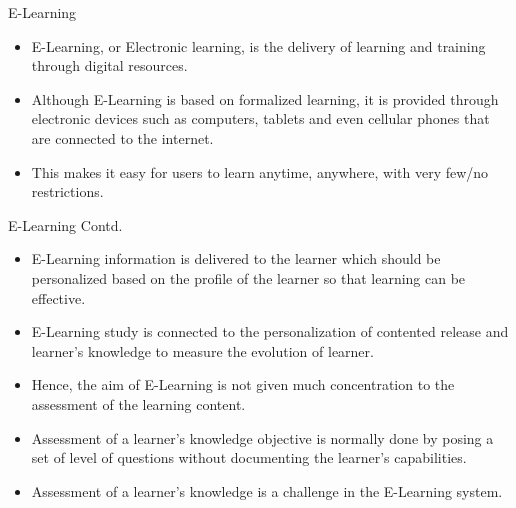 \documentclass{beamer}
\begin{document}
    \begin{frame}
    \begin{block}{E-Learning}
    \begin{itemize}
        \item E-Learning, or Electronic learning, is the delivery of learning and training through digital resources.
        \item Although E-Learning is based on formalized learning, it is provided through electronic devices such as computers, tablets and even cellular phones that are connected to the internet.
        \item This makes it easy for users to learn anytime, anywhere, with very few/no restrictions.
        \end{itemize}
    \end{block}
    \end{frame}
    
    
    
    \begin{frame}
        \begin{block}{E-Learning Contd.}
            \begin{itemize}
            \item  E-Learning information is delivered to the learner which should be personalized based on the profile of the learner so that learning can be effective.
            \item E-Learning study is connected to the personalization of contented release and learner’s knowledge to measure the evolution of learner.
            \item Hence, the aim of E-Learning is not given much concentration to the assessment of the learning content.
            \item Assessment of a learner’s knowledge objective is normally done by posing a set of level of questions without documenting the learner’s capabilities.
            \item Assessment of a learner’s knowledge is a challenge in the E-Learning system.
            \end{itemize}
        \end{block}
    \end{frame}
\end{document}
